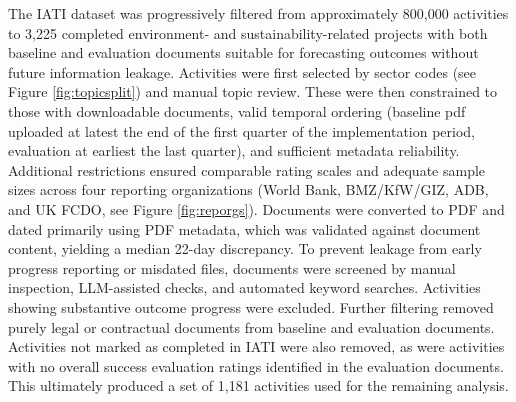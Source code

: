 The IATI dataset was progressively filtered from approximately 800,000 activities to 3,225 completed environment- and sustainability-related projects with both baseline and evaluation documents suitable for forecasting outcomes without future information leakage. Activities were first selected by sector codes (see Figure \ref{fig:topicsplit}) and manual topic review. These were then constrained to those with downloadable documents, valid temporal ordering (baseline pdf uploaded at latest the end of the first quarter of the implementation period, evaluation at earliest the last quarter), and sufficient metadata reliability. Additional restrictions ensured comparable rating scales and adequate sample sizes across four reporting organizations (World Bank, BMZ/KfW/GIZ, ADB, and UK FCDO, see Figure \ref{fig:reporgs}). Documents were converted to PDF and dated primarily using PDF metadata, which was validated against document content, yielding a median 22-day discrepancy. To prevent leakage from early progress reporting or misdated files, documents were screened by manual inspection, LLM-assisted checks, and automated keyword searches. Activities showing substantive outcome progress were excluded. Further filtering removed purely legal or contractual documents from baseline and evaluation documents. Activities not marked as completed in IATI were also removed, as were activities with no overall success evaluation ratings identified in the evaluation documents. This ultimately produced a set of 1,181 activities used for the remaining analysis.






